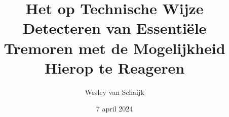 \documentclass{article}
\title{Het op Technische Wijze Detecteren van Essentiële Tremoren met de Mogelijkheid Hierop te Reageren}
\author{Wesley van Schaijk}
\date{7 april 2024}
\begin{document}
\maketitle



\tableofcontents

\begin{multicols}{2}
    
    
    
    
    
    
    
\end{multicols}

{
\raggedright


}
\end{document}
